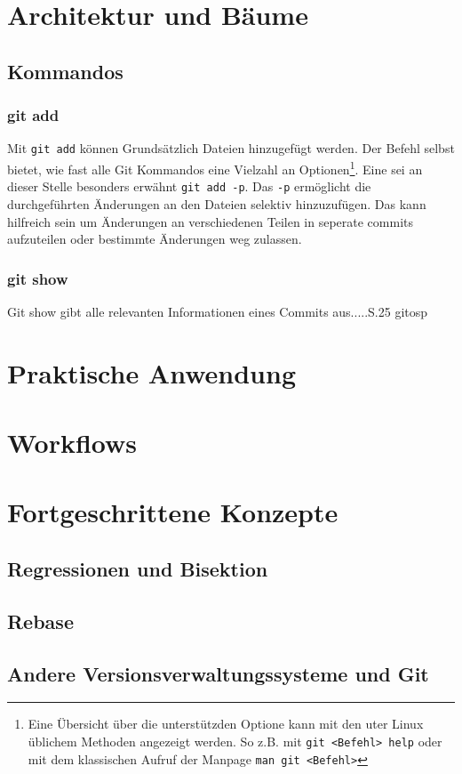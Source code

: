 \section{Architektur und Bäume}\label{sec:trees}
\subsection{Kommandos}\label{sec:commands}

\subsubsection{git add}
Mit \texttt{git add} können Grundsätzlich Dateien hinzugefügt werden. Der
Befehl selbst bietet, wie fast alle Git Kommandos eine Vielzahl an
Optionen\footnote{Eine Übersicht über die unterstützden Optione kann mit den
uter Linux üblichem Methoden angezeigt werden. So z.B. mit \texttt{git <Befehl>
help} oder mit dem klassischen Aufruf der Manpage \texttt{man git <Befehl>}}.
Eine sei an dieser Stelle besonders erwähnt \texttt{git add -p}. Das
\texttt{-p} ermöglicht die durchgeführten Änderungen an den Dateien selektiv
hinzuzufügen. Das kann hilfreich sein um Änderungen an verschiedenen Teilen in
seperate \glspl{commit} aufzuteilen oder bestimmte Änderungen weg zulassen.

\subsubsection{git show}\label{sec:gitshow}
Git show gibt alle relevanten Informationen eines Commits aus.....S.25 gitosp

\section{Praktische Anwendung}
\label{sec:Praxis}
\section{Workflows}
\label{sec:Workflows}
\section{Fortgeschrittene Konzepte}
\label{sec:FortgeschritteneKonzepte}
\subsection{Regressionen und Bisektion}\label{sec:bisec}
\subsection{Rebase}\label{sec:rebase}
\subsection{Andere Versionsverwaltungssysteme und Git}
\label{sec:AndereVersionsverwaltungssystemeundGit}
